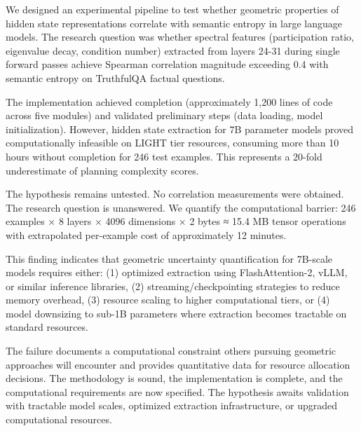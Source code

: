 
We designed an experimental pipeline to test whether geometric properties of hidden state representations correlate with semantic entropy in large language models. The research question was whether spectral features (participation ratio, eigenvalue decay, condition number) extracted from layers 24-31 during single forward passes achieve Spearman correlation magnitude exceeding 0.4 with semantic entropy on TruthfulQA factual questions.

The implementation achieved completion (approximately 1,200 lines of code across five modules) and validated preliminary steps (data loading, model initialization). However, hidden state extraction for 7B parameter models proved computationally infeasible on LIGHT tier resources, consuming more than 10 hours without completion for 246 test examples. This represents a 20-fold underestimate of planning complexity scores.

The hypothesis remains untested. No correlation measurements were obtained. The research question is unanswered. We quantify the computational barrier: 246 examples × 8 layers × 4096 dimensions × 2 bytes ≈ 15.4 MB tensor operations with extrapolated per-example cost of approximately 12 minutes.

This finding indicates that geometric uncertainty quantification for 7B-scale models requires either: (1) optimized extraction using FlashAttention-2, vLLM, or similar inference libraries, (2) streaming/checkpointing strategies to reduce memory overhead, (3) resource scaling to higher computational tiers, or (4) model downsizing to sub-1B parameters where extraction becomes tractable on standard resources.

The failure documents a computational constraint others pursuing geometric approaches will encounter and provides quantitative data for resource allocation decisions. The methodology is sound, the implementation is complete, and the computational requirements are now specified. The hypothesis awaits validation with tractable model scales, optimized extraction infrastructure, or upgraded computational resources.
